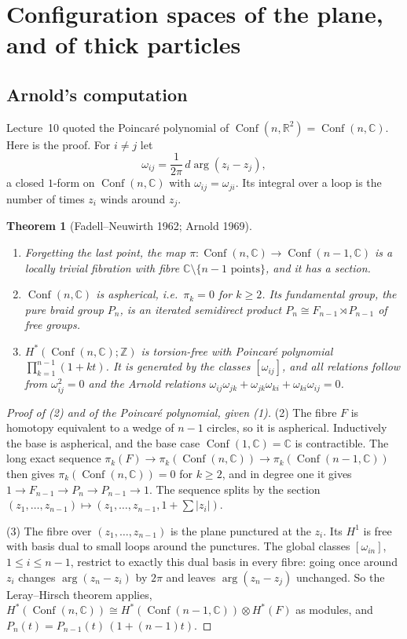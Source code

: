 \documentclass[11pt,openany]{book}
\theoremstyle{plain}
\newtheorem{theorem}{Theorem}[chapter]
\theoremstyle{definition}
\theoremstyle{remark}
\newcommand{\R}{\mathbb{R}}
\newcommand{\Z}{\mathbb{Z}}
\newcommand{\C}{\mathbb{C}}
\newcommand{\Conf}{\operatorname{Conf}}
\newcommand{\abs}[1]{\left\lvert #1 \right\rvert}
\begin{document}
\section{Configuration spaces of the plane, and of thick particles}
\label{TOP:sec:conf}

\subsection{Arnold's computation}

Lecture~10 quoted the Poincar\'e polynomial of $\Conf(n,\R^2)=\Conf(n,\C)$. Here is the proof.
For $i\ne j$ let
\[
  \omega_{ij}=\frac1{2\pi}\,d\arg(z_i-z_j),
\]
a closed $1$-form on $\Conf(n,\C)$ with $\omega_{ij}=\omega_{ji}$. Its integral over a loop is the number of
times $z_i$ winds around $z_j$.

\begin{theorem}[Fadell--Neuwirth 1962; Arnold 1969]\label{TOP:thm:arnold}
\begin{enumerate}[nosep]
\item Forgetting the last point, the map $\pi\colon\Conf(n,\C)\to\Conf(n-1,\C)$ is a locally trivial
  fibration with fibre $\C\setminus\{n-1\text{ points}\}$, and it has a section.
\item $\Conf(n,\C)$ is aspherical, i.e.\ $\pi_k=0$ for $k\ge2$. Its fundamental group, the pure braid group
  $P_n$, is an iterated semidirect product $P_n\cong F_{n-1}\rtimes P_{n-1}$ of free groups.
\item $H^*(\Conf(n,\C);\Z)$ is torsion-free with Poincar\'e polynomial
  $\prod_{k=1}^{n-1}(1+kt)$. It is generated by the classes $[\omega_{ij}]$, and all relations follow from
  $\omega_{ij}^2=0$ and the \emph{Arnold relations} $\omega_{ij}\omega_{jk}+\omega_{jk}\omega_{ki}+\omega_{ki}\omega_{ij}=0$.
\end{enumerate}
\end{theorem}

\begin{proof}[Proof of (2) and of the Poincar\'e polynomial, given (1)]
(2) The fibre $F$ is homotopy equivalent to a wedge of $n-1$ circles, so it is aspherical. Inductively the base is
aspherical, and the base case $\Conf(1,\C)=\C$ is contractible. The long exact sequence
$\pi_k(F)\to\pi_k(\Conf(n,\C))\to\pi_k(\Conf(n-1,\C))$ then gives $\pi_k(\Conf(n,\C))=0$ for $k\ge2$, and in
degree one it gives $1\to F_{n-1}\to P_n\to P_{n-1}\to1$. The sequence splits by the section
$(z_1,\dots,z_{n-1})\mapsto(z_1,\dots,z_{n-1},1+\sum\abs{z_i})$.

(3) The fibre over $(z_1,\dots,z_{n-1})$ is the plane punctured at the $z_i$. Its $H^1$ is free with
basis dual to small loops around the punctures. The global classes $[\omega_{in}]$, $1\le i\le n-1$,
restrict to exactly this dual basis in every fibre: going once around $z_i$ changes $\arg(z_n-z_i)$ by $2\pi$
and leaves $\arg(z_n-z_j)$ unchanged. So the Leray--Hirsch theorem applies, $H^*(\Conf(n,\C))\cong
H^*(\Conf(n-1,\C))\otimes H^*(F)$ as modules, and $P_n(t)=P_{n-1}(t)\,(1+(n-1)t)$.
\end{proof}
\end{document}
